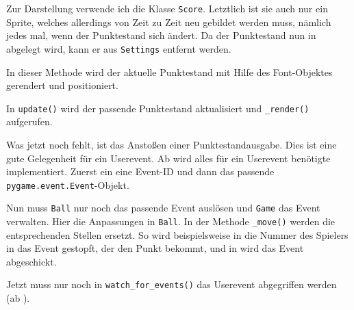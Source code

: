 Zur Darstellung verwende ich die Klasse \texttt{Score}. Letztlich ist sie auch nur ein Sprite, welches allerdings von Zeit zu Zeit neu gebildet werden muss, nämlich jedes mal, wenn der Punktestand sich ändert. Da der Punktestand nun in  abgelegt wird, kann er aus \texttt{Settings} entfernt werden.


In dieser Methode wird der aktuelle Punktestand mit Hilfe des Font-Objektes gerendert und positioniert.


In \texttt{update()} wird der passende Punktestand aktualisiert und \texttt{\_render()} aufgerufen. 

\newpage
{}

Was jetzt noch fehlt, ist das Anstoßen einer Punktestandausgabe. Dies ist eine gute Gelegenheit für ein Userevent. Ab  wird alles für ein Userevent benötigte implementiert. Zuerst ein eine Event-ID und dann das passende \texttt{pygame.e\-vent\-.E\-vent}-Objekt.


Nun muss \texttt{Ball} nur noch das passende Event auslösen und \texttt{Game} das Event verwalten. Hier die Anpassungen in \texttt{Ball}. In der Methode \texttt{\_move()} werden die entsprechenden Stellen ersetzt. So wird beispielsweise in  die Nummer des Spielers in das Event gestopft, der den Punkt bekommt, und in  wird das Event abgeschickt.


Jetzt muss nur noch in \texttt{watch\_for\_events()} das Userevent abgegriffen werden (ab ).




